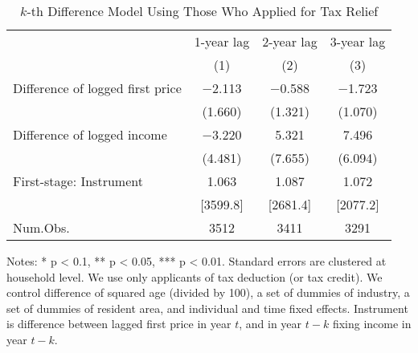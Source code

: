 \begin{table}

\caption{$k$-th Difference Model Using Those Who Applied for Tax Relief \label{tab:kdiff-model}}
\centering
\fontsize{8}{10}\selectfont
\begin{threeparttable}
\begin{tabular}[t]{lccc}
\toprule
\multicolumn{1}{c}{ } & \multicolumn{1}{c}{1-year lag} & \multicolumn{1}{c}{2-year lag} & \multicolumn{1}{c}{3-year lag} \\
\cmidrule(l{3pt}r{3pt}){2-2} \cmidrule(l{3pt}r{3pt}){3-3} \cmidrule(l{3pt}r{3pt}){4-4}
  & (1) & (2) & (3)\\
\midrule
Difference of logged first price & \num{-2.113} & \num{-0.588} & \num{-1.723}\\
 & (\num{1.660}) & (\num{1.321}) & (\num{1.070})\\
Difference of logged income & \num{-3.220} & \num{5.321} & \num{7.496}\\
 & (\num{4.481}) & (\num{7.655}) & (\num{6.094})\\
\midrule
First-stage: Instrument & 1.063 & 1.087 & 1.072\\
 & {}[3599.8] & {}[2681.4] & {}[2077.2]\\
Num.Obs. & \num{3512} & \num{3411} & \num{3291}\\
\bottomrule
\end{tabular}
\begin{tablenotes}
\item Notes: * p < 0.1, ** p < 0.05, *** p < 0.01. Standard errors are clustered at household level. We use only applicants of tax deduction (or tax credit). We control difference of squared age (divided by 100), a set of dummies of industry, a set of dummies of resident area, and individual and time fixed effects. Instrument is difference between lagged first price in year $t$, and in year $t - k$ fixing income in year $t - k$.
\end{tablenotes}
\end{threeparttable}
\end{table}
